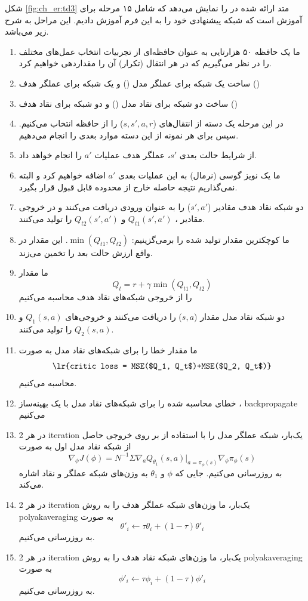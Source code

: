 شکل \ref{fig:ch_er:td3} متد ارائه شده در \cite{fujimoto2018addressing} را نمایش می‌دهد که شامل ۱۵ مرحله برای آموزش است که شبکه پیشنهادی خود را به این فرم آموزش دادیم. این مراحل به شرح زیر می‌باشد.
\begin{enumerate}
	\item
ما یک حافظه ۵۰ هزارتایی به عنوان حافظه‌ای از تجربیات انتخاب عمل‌های مختلف را در نظر می‌گیریم که در هر انتقال (تکرار) آن را مقداردهی خواهیم کرد.
\item
ساخت یک شبکه برای عملگر مدل () و یک شبکه برای عملگر هدف ()
\item
ساخت دو شبکه برای نقاد مدل () و دو شبکه برای نقاد هدف ()
	
\item
در این مرحله یک دسته از انتقال‌های ($s, s', a, r$) را از حافظه انتخاب می‌کنیم. سپس برای هر نمونه از این دسته موارد بعدی را انجام می‌دهیم.
\item
از شرایط حالت بعدی $s'$، عملگر هدف عملیات $a'$ را انجام خواهد داد.
\item
ما یک نویز گوسی (نرمال) به این عملیات بعدی $a'$ اضافه خواهیم کرد و البته نمی‌گذاریم نتیجه حاصله خارج از محدوده قابل قبول قرار بگیرد.
\item
دو شبکه نقاد هدف مقادیر ($s',a'$) را به عنوان ورودی دریافت می‌کنند و در خروجی مقادیر
 ، 
$Q_{t1}(s',a')$
 و
 $Q_{t2}(s',a')$
  را تولید می‌کنند.
\item
ما کوچکترین مقدار  تولید شده را برمی‌گزینیم: $\min(Q_{t1}, Q_{t2})$. این مقدار در واقع ارزش حالت بعد را تخمین می‌زند.
\item
ما مقدار
$$Q_t=r+\gamma\min(Q_{t1}, Q_{t2})$$
 را از خروجی شبکه‌های نقاد هدف محاسبه می‌کنیم
\item
دو شبکه نقاد مدل مقدار ($s,a$) را دریافت می‌کنند و خروجی‌های 
$Q_1(s,a)$ و $Q_2(s,a)$
 را تولید می‌کنند.
\item
ما مقدار خطا را برای شبکه‌های نقاد مدل به صورت
$$\text{\lr{critic loss = MSE($Q_1, Q_t$)+MSE($Q_2, Q_t$)}}$$
 محاسبه می‌کنیم.
\item
خطای محاسبه شده را برای شبکه‌های نقاد مدل با یک بهینه‌ساز ، \gls{backpropagate} می‌کنیم
\item
در هر 2 \gls{iteration} یک‌بار، شبکه عملگر مدل را با استفاده از  بر روی خروجی حاصل از شبکه نقاد مدل اول به صورت
$$\nabla_{\phi}J(\phi)=N^{-1}\Sigma\nabla_aQ_{\theta_1}(s,a)|_{a=\pi_\phi(s)}\nabla_\phi\pi_\phi(s)$$
به روزرسانی می‌کنیم. جایی که $\phi$ و $\theta_1$ به وزن‌های شبکه عملگر و نقاد اشاره می‌کند.
\item
در هر 2 \gls{iteration} یک‌بار، ما وزن‌های شبکه عملگر هدف را به روش \gls{polyakaveraging} به صورت 
$$\theta'_i \leftarrow \tau\theta_i+(1-\tau)\theta'_i$$
به روزرسانی می‌کنیم.
\item
در هر 2 \gls{iteration} یک‌بار، ما وزن‌های شبکه نقاد هدف را به روش \gls{polyakaveraging} به صورت 
$$\phi'_i \leftarrow \tau\phi_i+(1-\tau)\phi'_i$$
 به روزرسانی می‌کنیم.
\end{enumerate}
